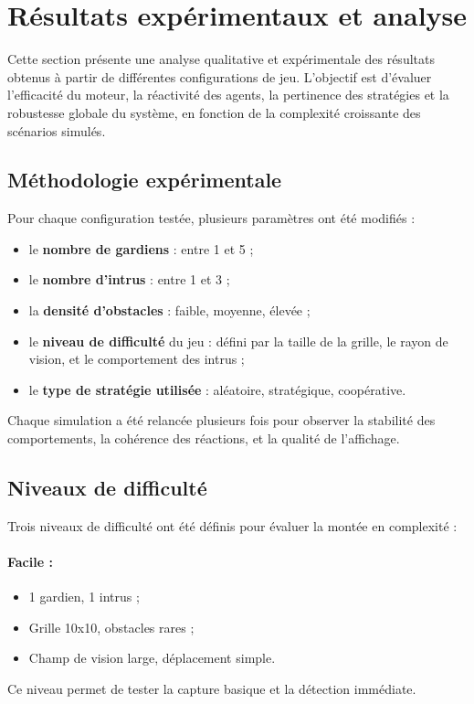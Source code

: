 

\section{Résultats expérimentaux et analyse}

Cette section présente une analyse qualitative et expérimentale des résultats obtenus à partir de différentes configurations de jeu. L’objectif est d’évaluer l’efficacité du moteur, la réactivité des agents, la pertinence des stratégies et la robustesse globale du système, en fonction de la complexité croissante des scénarios simulés.

\subsection{Méthodologie expérimentale}

Pour chaque configuration testée, plusieurs paramètres ont été modifiés :
\begin{itemize}
    \item le \textbf{nombre de gardiens} : entre 1 et 5 ;
    \item le \textbf{nombre d’intrus} : entre 1 et 3 ;
    \item la \textbf{densité d’obstacles} : faible, moyenne, élevée ;
    \item le \textbf{niveau de difficulté} du jeu : défini par la taille de la grille, le rayon de vision, et le comportement des intrus ;
    \item le \textbf{type de stratégie utilisée} : aléatoire, stratégique, coopérative.
\end{itemize}

Chaque simulation a été relancée plusieurs fois pour observer la stabilité des comportements, la cohérence des réactions, et la qualité de l'affichage.

\subsection{Niveaux de difficulté}

Trois niveaux de difficulté ont été définis pour évaluer la montée en complexité :

\paragraph{Facile :}
\begin{itemize}
    \item 1 gardien, 1 intrus ;
    \item Grille 10x10, obstacles rares ;
    \item Champ de vision large, déplacement simple.
\end{itemize}
Ce niveau permet de tester la capture basique et la détection immédiate.


